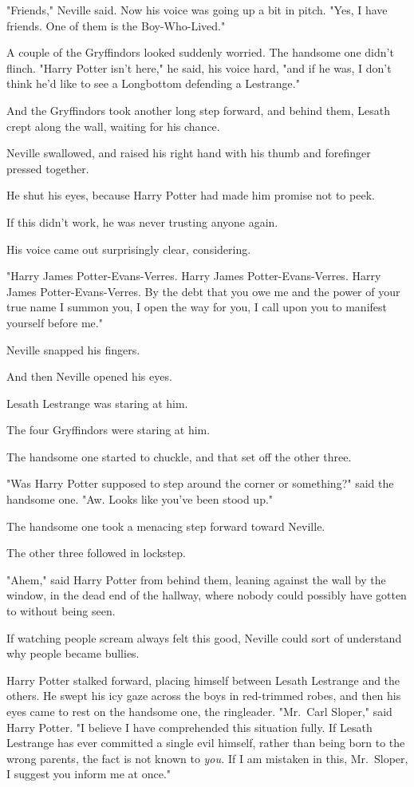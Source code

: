 "Friends," Neville said. Now his voice was going up a bit in pitch. "Yes, I
have friends. One of them is the Boy-Who-Lived."

A couple of the Gryffindors looked suddenly worried. The handsome one didn't
flinch. "Harry Potter isn't here," he said, his voice hard, "and if he was, I
don't think he'd like to see a Longbottom defending a Lestrange."

And the Gryffindors took another long step forward, and behind them, Lesath
crept along the wall, waiting for his chance.

Neville swallowed, and raised his right hand with his thumb and forefinger
pressed together.

He shut his eyes, because Harry Potter had made him promise not to peek.

If this didn't work, he was never trusting anyone again.

His voice came out surprisingly clear, considering.

"Harry James Potter-Evans-Verres. Harry James Potter-Evans-Verres. Harry James
Potter-Evans-Verres. By the debt that you owe me and the power of your true
name I summon you, I open the way for you, I call upon you to manifest yourself
before me."

Neville snapped his fingers.

And then Neville opened his eyes.

Lesath Lestrange was staring at him.

The four Gryffindors were staring at him.

The handsome one started to chuckle, and that set off the other three.

"Was Harry Potter supposed to step around the corner or something?" said the
handsome one. "Aw. Looks like you've been stood up."

The handsome one took a menacing step forward toward Neville.

The other three followed in lockstep.

"Ahem," said Harry Potter from behind them, leaning against the wall by the
window, in the dead end of the hallway, where nobody could possibly have gotten
to without being seen.

If watching people scream always felt this good, Neville could sort of
understand why people became bullies.

Harry Potter stalked forward, placing himself between Lesath Lestrange and the
others. He swept his icy gaze across the boys in red-trimmed robes, and then
his eyes came to rest on the handsome one, the ringleader. "Mr.~Carl Sloper,"
said Harry Potter. "I believe I have comprehended this situation fully. If
Lesath Lestrange has ever committed a single evil himself, rather than being
born to the wrong parents, the fact is not known to \emph{you.} If I am
mistaken in this, Mr.~Sloper, I suggest you inform me at once."

